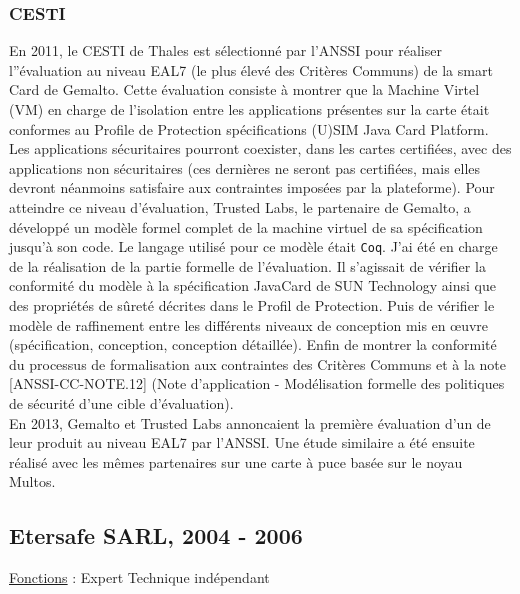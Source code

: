 \documentclass[a4paper,12pt]{article}
\newcommand{\Coq}{{\tt Coq}}
\begin{document}
\subsubsection{CESTI}
En 2011, le CESTI de Thales est s\'electionn\'e par l'ANSSI pour
r\'ealiser l''\'evaluation au niveau EAL7 (le plus \'elev\'e des
Crit\`eres Communs) de la smart Card de Gemalto. Cette \'evaluation
consiste \`a montrer que la Machine Virtel (VM) en charge de
l'isolation entre les applications pr\'esentes sur la carte \'etait
conformes au Profile de Protection sp\'ecifications (U)SIM Java Card
Platform.  Les applications s\'ecuritaires pourront coexister, dans
les cartes certifi\'ees, avec des applications non s\'ecuritaires (ces
derni\`eres ne seront pas certifi\'ees, mais elles devront n\'eanmoins
satisfaire aux contraintes impos\'ees par la plateforme).  Pour
atteindre ce niveau d'\'evaluation, Trusted Labs, le partenaire de
Gemalto, a d\'evelopp\'e un mod\`ele formel complet de la machine
virtuel de sa sp\'ecification jusqu'\`a son code. Le langage utilis\'e
pour ce mod\`ele \'etait \Coq.  J'ai \'et\'e en charge de la
r\'ealisation de la partie formelle de l'\'evaluation. Il s'agissait
de v\'erifier la conformit\'e du mod\`ele \`a la sp\'ecification
JavaCard de SUN Technology ainsi que des propri\'et\'es de s\^uret\'e
d\'ecrites dans le Profil de Protection. Puis de v\'erifier le
mod\`ele de raffinement entre les diff\'erents niveaux de conception
mis en \oe{}uvre (sp\'ecification, conception, conception
d\'etaill\'ee). Enfin de montrer la conformit\'e du processus de
formalisation aux contraintes des Crit\`eres Communs et \`a la note
[ANSSI-CC-NOTE.12] (Note d'application - Mod\'elisation formelle des
politiques de s\'ecurit\'e d'une cible d'\'evaluation).
\\
En 2013, Gemalto et Trusted Labs annoncaient la premi\`ere
\'evaluation d'un de leur produit au niveau EAL7 par l'ANSSI. Une \'etude
similaire a \'et\'e ensuite r\'ealis\'e avec les m\^emes partenaires
sur une carte \`a puce bas\'ee sur le noyau Multos. 

\subsection{Etersafe SARL,  2004 - 2006}
\hspace{-0.6cm}\underline{Fonctions} : Expert Technique ind\'ependant
\\
\end{document}
